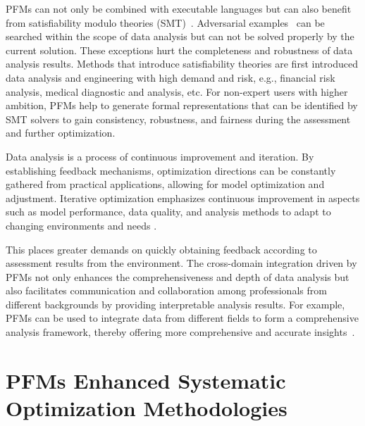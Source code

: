   PFMs can not only be combined with executable languages but can also benefit from satisfiability modulo theories (SMT)~\cite{ye2024satlm}. Adversarial examples~\cite{jha2023counterexample} can be searched within the scope of data analysis but can not be solved properly by the current solution. These exceptions hurt the completeness and robustness of data analysis results. Methods that introduce satisfiability theories are first introduced data analysis and engineering with high demand and risk, e.g., financial risk analysis, medical diagnostic and analysis, etc. For non-expert users with higher ambition, PFMs help to generate formal representations that can be identified by SMT solvers to gain consistency, robustness, and fairness during the assessment and further optimization.
  
  
  
  Data analysis is a process of continuous improvement and iteration. By establishing feedback mechanisms, optimization directions can be constantly gathered from practical applications, allowing for model optimization and adjustment. Iterative optimization emphasizes continuous improvement in aspects such as model performance, data quality, and analysis methods to adapt to changing environments and needs \cite{033kaelbling1996reinforcement}.
  
  
  
  This places greater demands on quickly obtaining feedback according to assessment results from the environment. The cross-domain integration driven by PFMs not only enhances the comprehensiveness and depth of data analysis but also facilitates communication and collaboration among professionals from different backgrounds by providing interpretable analysis results. For example, PFMs can be used to integrate data from different fields to form a comprehensive analysis framework, thereby offering more comprehensive and accurate insights~\cite{yang2024give, hu2023survey}.
  
  
  


  
  
  \section{PFMs Enhanced Systematic Optimization Methodologies}~\label{sec:methods}
  
  
